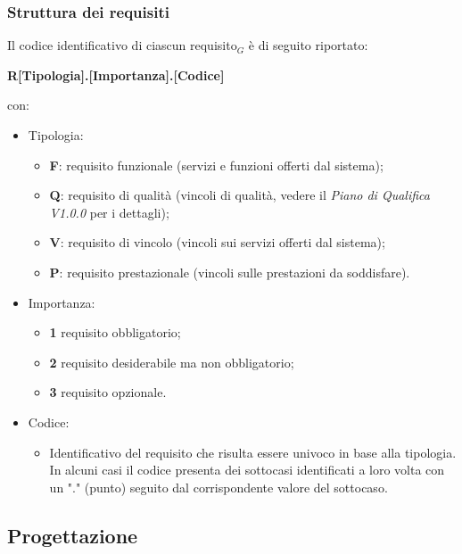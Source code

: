     \subsubsection{Struttura dei requisiti}
      Il codice identificativo di ciascun requisito$_G$ è di seguito riportato:
      \begin{center}
        \textbf{R[Tipologia].[Importanza].[Codice]}\\
      \end{center}
      con:
      \begin{itemize}
        \item Tipologia:
        \begin{itemize}
          \item \textbf{F}: requisito funzionale (servizi e funzioni offerti dal sistema);
          \item \textbf{Q}: requisito di qualità (vincoli di qualità, vedere il \textit{Piano di Qualifica V1.0.0} per i dettagli);
          \item \textbf{V}: requisito di vincolo (vincoli sui servizi offerti dal sistema);
          \item \textbf{P}: requisito prestazionale (vincoli sulle prestazioni da soddisfare).
        \end{itemize}

        \item Importanza:
        \begin{itemize}
          \item \textbf{1} requisito obbligatorio;
          \item \textbf{2} requisito desiderabile ma non obbligatorio;
          \item \textbf{3} requisito opzionale.
        \end{itemize}

        \item Codice:
        \begin{itemize}
          \item Identificativo del requisito che risulta essere univoco in base alla tipologia. In alcuni casi il codice presenta dei sottocasi identificati a loro volta con un "." (punto) seguito dal corrispondente valore del sottocaso.
        \end{itemize}

      \end{itemize}

  \subsection{Progettazione}
